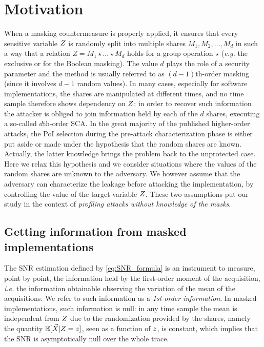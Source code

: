 \section{Motivation}
When a masking countermeasure is properly applied, it ensures that every sensitive variable $Z$  is randomly split  into multiple shares $M_1,M_2,\dots,M_d$ in such a way that a relation $Z = M_1 \star \dots \star M_d$ holds for a group operation $\star$ (\emph{e.g.} the exclusive or for the Boolean masking). The value $d$ plays the role of a security parameter and the method is usually referred to as $(d-1)$th-order masking (since it involves $d-1$ random values). In many cases, especially for software implementations, the shares are manipulated at different times, and no time sample therefore shows dependency on $Z$: in order to recover such  information the attacker is obliged to join information held by each of the $d$ shares, executing a so-called $d$th-order SCA. In the great majority of the published higher-order attacks, the PoI selection during the pre-attack characterization phase is either put aside or made  under the hypothesis that the random shares are known. Actually, the latter knowledge brings the problem back to the unprotected case. 
Here we relax this hypothesis and we consider  situations where the values of the random shares are unknown to the adversary. We however assume that the adversary can characterize the leakage before attacking the implementation, by controlling the value of the target variable $Z$. These two assumptions put our study in the context of {\em profiling attacks without knowledge of the masks}. \\

\subsection{Getting information from masked implementations}\label{sec:HO}
The SNR estimation defined by \eqref{eq:SNR_formula} is an instrument to measure, point by point, the information held by the first-order moment of the acquisition, \emph{i.e.} the information obtainable observing the variation of the mean of the acquisitions. We refer to such information as a \emph{1st-order information}. In masked implementations, such information is null: in any time sample the mean is independent from $Z$ due to the randomization provided by the shares, namely the quantity $\mathbb{E}[\vec{X}\vert Z=z]$, seen as a function of $z$, is constant, which implies that the SNR is asymptotically  null over the whole trace.\\
 
